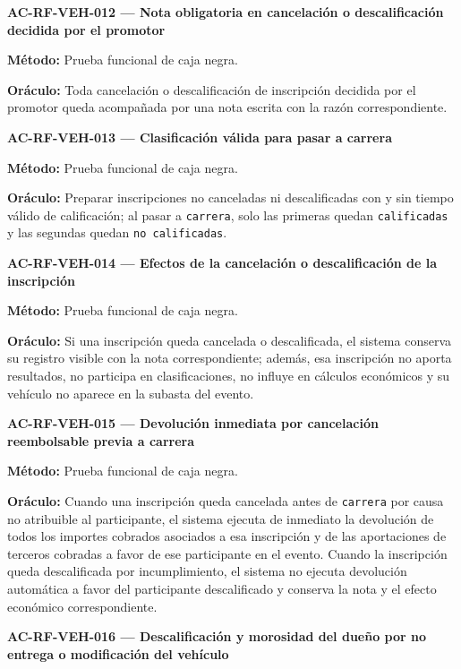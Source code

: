 \documentclass[10pt,letterpaper]{article}
\begin{document}
\noindent\textbf{AC-RF-VEH-012 --- Nota obligatoria en cancelación o descalificación decidida por el promotor}\par
\textbf{Método:} Prueba funcional de caja negra.\par
\textbf{Oráculo:} Toda cancelación o descalificación de inscripción decidida por el promotor queda acompañada por una nota escrita con la razón correspondiente.\par\vspace{0.45em}
\noindent\textbf{AC-RF-VEH-013 --- Clasificación válida para pasar a carrera}\par
\textbf{Método:} Prueba funcional de caja negra.\par
\textbf{Oráculo:} Preparar inscripciones no canceladas ni descalificadas con y sin tiempo válido de calificación; al pasar a \texttt{carrera}, solo las primeras quedan \texttt{calificadas} y las segundas quedan \texttt{no calificadas}.\par\vspace{0.45em}
\noindent\textbf{AC-RF-VEH-014 --- Efectos de la cancelación o descalificación de la inscripción}\par
\textbf{Método:} Prueba funcional de caja negra.\par
\textbf{Oráculo:} Si una inscripción queda cancelada o descalificada, el sistema conserva su registro visible con la nota correspondiente; además, esa inscripción no aporta resultados, no participa en clasificaciones, no influye en cálculos económicos y su vehículo no aparece en la subasta del evento.\par\vspace{0.45em}
\noindent\textbf{AC-RF-VEH-015 --- Devolución inmediata por cancelación reembolsable previa a carrera}\par
\textbf{Método:} Prueba funcional de caja negra.\par
\textbf{Oráculo:} Cuando una inscripción queda cancelada antes de \texttt{carrera} por causa no atribuible al participante, el sistema ejecuta de inmediato la devolución de todos los importes cobrados asociados a esa inscripción y de las aportaciones de terceros cobradas a favor de ese participante en el evento. Cuando la inscripción queda descalificada por incumplimiento, el sistema no ejecuta devolución automática a favor del participante descalificado y conserva la nota y el efecto económico correspondiente.\par\vspace{0.45em}
\noindent\textbf{AC-RF-VEH-016 --- Descalificación y morosidad del dueño por no entrega o modificación del vehículo}\par
\end{document}
